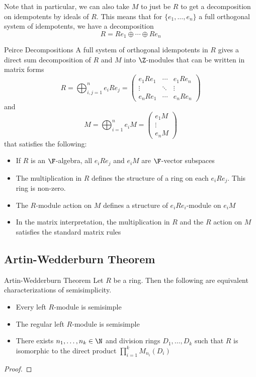 \documentclass[a4paper]{article}
\begin{document}
Note that in particular, we can also take $M$ to just be $R$ to get a decomposition on idempotents by ideals of $R$. This means that for $\{e_1,\dots,e_n\}$ a full orthogonal system of idempotents, we have a decomposition $$R=Re_1\oplus\cdots\oplus Re_n$$

\begin{thm}{Peirce Decompositions}{} A full system of orthogonal idempotents in $R$ gives a direct sum decomposition of $R$ and $M$ into $\Z$-modules that can be written in matrix forms $$R=\bigoplus_{i,j=1}^n e_iRe_j=\begin{pmatrix}
e_1Re_1 & \cdots & e_1Re_n\\
\vdots & \ddots & \vdots\\
e_nRe_1 & \cdots & e_nRe_n
\end{pmatrix}$$ and $$M=\bigoplus_{i=1}^ne_iM=\begin{pmatrix}
e_1M\\
\vdots\\
e_nM
\end{pmatrix}$$ that satisfies the following: 
\begin{itemize}
\item If $R$ is an $\F$-algebra, all $e_iRe_j$ and $e_iM$ are $\F$-vector subspaces
\item The multiplication in $R$ defines the structure of a ring on each $e_iRe_j$. This ring is non-zero. 
\item The $R$-module action on $M$ defines a structure of $e_iRe_i$-module on $e_iM$
\item In the matrix interpretation, the multiplication in $R$ and the $R$ action on $M$ satisfies the standard matrix rules
\end{itemize}
\end{thm}

\subsection{Artin-Wedderburn Theorem}
\begin{thm}{Artin-Wedderburn Theorem}{} Let $R$ be a ring. Then the following are equivalent characterizations of semisimplicity. 
\begin{itemize}
\item Every left $R$-module is semisimple
\item The regular left $R$-module is semisimple
\item There exists $n_1,\dots,n_k\in\N$ and division rings $D_1,\dots,D_k$ such that $R$ is isomorphic to the direct product $\prod_{i=1}^kM_{n_i}(D_i)$
\end{itemize} \tcbline
\begin{proof}

\end{proof}
\end{thm}
\end{document}
